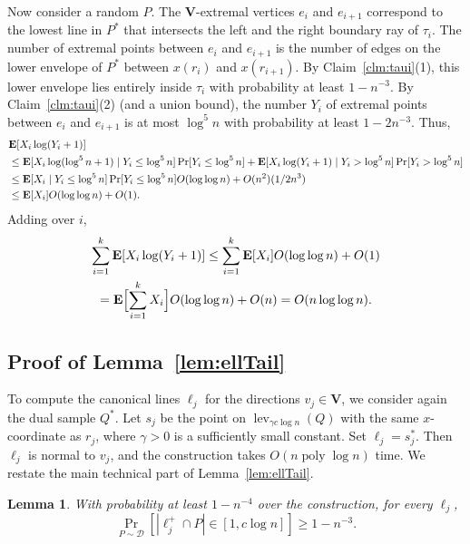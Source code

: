 \documentclass[letterpaper,11pt]{article}
\newtheorem{lemma}[theorem]{Lemma}
\newcommand{\EX}{\hbox{\bf E}}
\DeclareMathOperator{\poly}{poly}
\DeclareMathOperator{\lev}{lev}
\newcommand{\cD}{\mathcal{D}}
\begin{document}
Now consider a random $P$. 
The $\textbf{V}$-extremal 
vertices $e_i$ and $e_{i+1}$ 
correspond to the lowest line in 
$P^*$ that intersects the left and the
right boundary ray of $\tau_{i}$. 
The number of extremal points between
$e_i$ and $e_{i+1}$ is the number of edges 
on the lower envelope
of $P^*$ between $x(r_{i})$ and 
$x(r_{i+1})$. By Claim~\ref{clm:taui}(1),
this lower envelope lies entirely 
inside $\tau_{i}$ with probability
at least $1-n^{-3}$. 
By Claim~\ref{clm:taui}(2) 
(and a union bound), the number $Y_i$ of
extremal points between $e_i$ and
$e_{i+1}$ is at most $\log^5 n$ 
with probability at least $1-2n^{-3}$.
Thus, 
\begin{align*}
  &\EX[X_i \log (Y_i+1)]\\
  &\leq 
    \EX[X_i \log(\log^5n + 1) \mid Y_i \leq \log^5 n]
    \Pr[Y_i \leq \log^5n] + 
    \EX[X_i \log (Y_i+1) \mid Y_i > \log^5n]
    \Pr[Y_i > \log^5n]\\
  &\leq \EX[X_i  \mid Y_i \leq \log^5n]
    \Pr[Y_i \leq \log^5n]O(\log\log n) + 
    O(n^2) (1/2n^3)\\
    &\leq \EX[X_i] O(\log\log n) + O(1).
\end{align*}
Adding over $i$, 
\begin{multline*}
  \sum_{i=1}^k \EX[X_i \log (Y_i+1)]
  \leq 
  \sum_{i=1}^k \EX[X_i]O(\log\log n) + O(1) \\
  = \EX\Bigl[ \sum_{i=1}^k X_i \Bigr] O(\log\log n) + O(n)
  = O(n\log\log n).
\end{multline*}

\subsection{Proof of Lemma~\ref{lem:ellTail}}\label{sec:ellTail}

To compute the canonical lines 
$\ell_j$ for the directions
$v_j \in \textbf{V}$, we 
consider again the dual 
sample $Q^*$.
Let $s_j$ be the point on
$\lev_{\gamma c\log n}(Q)$ with 
the same $x$-coordinate as 
$r_{j}$, where $\gamma > 0$ 
is a sufficiently
small constant.
Set $\ell_j = s_j^*$.
Then 
$\ell_j$ is normal to $v_j$,
and the construction takes  
$O(n\poly\log n)$ time. 
We restate the
main technical part 
of Lemma~\ref{lem:ellTail}.

\begin{lemma}
  With probability at least $1-n^{-4}$ 
  over the construction, 
  for every $\ell_j$, 
  \[
    \Pr_{P \sim \cD}[|\ell_j^+ \cap P| \in [1, c\log n]] \geq 1 - n^{-3}.
  \]
\end{lemma}
\end{document}
